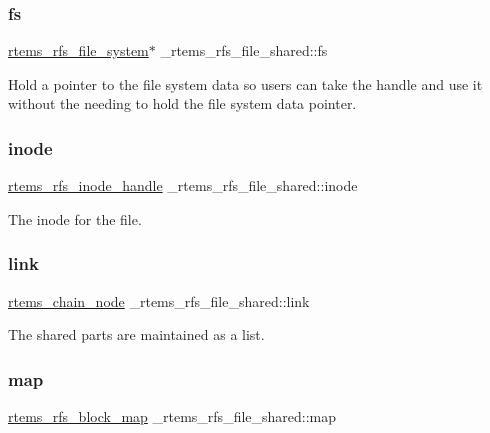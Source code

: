 \subsubsection{\texorpdfstring{fs}{fs}}
{\footnotesize\ttfamily \mbox{\hyperlink{struct__rtems__rfs__file__system}{rtems\+\_\+rfs\+\_\+file\+\_\+system}}$\ast$ \+\_\+rtems\+\_\+rfs\+\_\+file\+\_\+shared\+::fs}

Hold a pointer to the file system data so users can take the handle and use it without the needing to hold the file system data pointer. \mbox{\label{struct__rtems__rfs__file__shared_a612c91853406705d5737030a7f6a157e}} 
\subsubsection{\texorpdfstring{inode}{inode}}
{\footnotesize\ttfamily \mbox{\hyperlink{rtems-rfs-inode_8h_a91f02dac5a2d91e072d676f3266ab8d2}{rtems\+\_\+rfs\+\_\+inode\+\_\+handle}} \+\_\+rtems\+\_\+rfs\+\_\+file\+\_\+shared\+::inode}

The inode for the file. \mbox{\label{struct__rtems__rfs__file__shared_ac9a589e20a44f9986e7efb45cf9db9b5}} 
\subsubsection{\texorpdfstring{link}{link}}
{\footnotesize\ttfamily \mbox{\hyperlink{structChain__Node__struct}{rtems\+\_\+chain\+\_\+node}} \+\_\+rtems\+\_\+rfs\+\_\+file\+\_\+shared\+::link}

The shared parts are maintained as a list. \mbox{\label{struct__rtems__rfs__file__shared_aad10c2e2758c7412b77b6b674b0bb1f2}} 
\subsubsection{\texorpdfstring{map}{map}}
{\footnotesize\ttfamily \mbox{\hyperlink{rtems-rfs-block_8h_af488270acef452a961e888bffdc3a7bf}{rtems\+\_\+rfs\+\_\+block\+\_\+map}} \+\_\+rtems\+\_\+rfs\+\_\+file\+\_\+shared\+::map}

